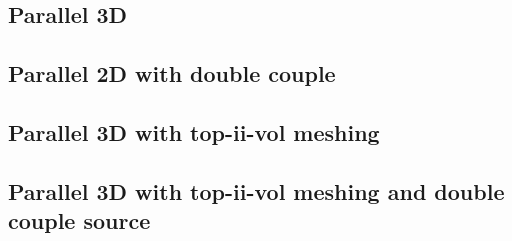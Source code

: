 \subsection{Parallel 3D}

{
	\renewcommand{\subsection}{\subsubsection}
	
}

\subsection{Parallel 2D with double couple}

{
	\renewcommand{\subsection}{\subsubsection}
	
}
\subsection{Parallel 3D with top-ii-vol meshing}

{
	\renewcommand{\subsection}{\subsubsection}
	
}


\subsection{Parallel 3D with top-ii-vol meshing and double couple source}

{
	\renewcommand{\subsection}{\subsubsection}
	
}

